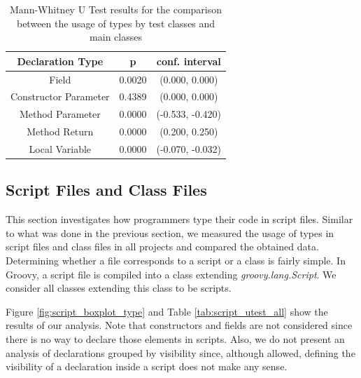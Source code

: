 \documentclass[preprint]{sigplanconf}
\begin{document}
\begin{table}[h!]
\centering{}%
\begin{tabular}{|c|c|c|}
\hline 
Declaration Type 		& p & conf. interval \\
\hline 
\hline 
Field                             & 0.0020		& (0.000, 0.000) \\ \hline
Constructor Parameter  & 0.4389	& (0.000, 0.000) \\ \hline
Method Parameter         & 0.0000	& (-0.533, -0.420) \\ \hline
Method Return              & 0.0000	& (0.200, 0.250) \\ \hline
Local Variable               & 0.0000		& (-0.070, -0.032) \\ 
\hline 
\end{tabular}
\caption{Mann-Whitney U Test results for the comparison between the usage of types by test classes and main classes}
\label{tab:test_utest_type}
\end{table}

\subsection{Script Files and Class Files\label{sec:results-scripts}}
This section investigates how programmers type their code in script files.
Similar to what was done in the previous section, we measured the usage of types in script files and class files in all projects and compared the obtained data.
Determining whether a file corresponds to a script or a class is fairly simple.
In Groovy, a script file is compiled into a class extending \emph{groovy.lang.Script}.
We consider all classes extending this class to be scripts.

Figure \ref{fig:script_boxplot_type} and Table \ref{tab:script_utest_all} show the results of our analysis.
Note that constructors and fields are not considered since there is no way to declare those elements in scripts.
Also, we do not present an analysis of declarations grouped by visibility since, although allowed, defining the visibility of a declaration inside a script does not make any sense.
\end{document}
